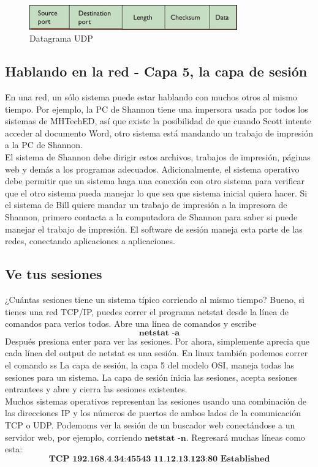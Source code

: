 \documentclass[12pt]{report}
\begin{document}
\begin{figure}[h]
\centering
\includegraphics[width=0.8\textwidth]{Datagrama.png}
\caption{Datagrama UDP}
\end{figure}

\subsection{Hablando en la red - Capa 5, la capa de sesión}
En una red, un sólo sistema puede estar hablando con muchos otros al mismo tiempo.
Por ejemplo, la PC de Shannon tiene una impersora usada por todos los sistemas
de MHTechED, así que existe la posibilidad de que cuando Scott intente 
acceder al documento Word, otro sistema está mandando un trabajo de impresión 
a la PC de Shannon.\\
El sistema de Shannon debe dirigir estos archivos, trabajos de impresión,
páginas web y demás a los programas adecuados. Adicionalmente,
el sistema operativo debe permitir que un sistema haga una conexión 
con otro sistema para verificar que el otro sistema pueda manejar lo que sea que 
sistema inicial quiera hacer. Si el sistema de Bill quiere mandar un 
trabajo de impresión a la impresora de Shannon, primero contacta
a la computadora de Shannon para saber si puede manejar el trabajo de impresión.
El software de sesión maneja esta parte de las redes, conectando 
aplicaciones a aplicaciones.\\

\subsection{Ve tus sesiones}
¿Cuántas sesiones tiene un sistema típico corriendo al mismo tiempo?
Bueno, si tienes una red TCP/IP, puedes correr el programa netstat 
desde la línea de comandos para verlos todos. Abre una línea de comandos y escribe
$$\textbf{netstat -a}$$
Después presiona enter para ver las sesiones. Por ahora, simplemente aprecia que cada línea
del output de netstat es una sesión. En linux también podemos correr el comando ss
La capa de sesión, la capa 5 del modelo OSI, maneja todas las sesiones para un sistema.
La capa de sesión inicia las sesiones, acepta sesiones entrantees y abre y cierra las sesiones
existentes.\\
Muchos sistemas operativos representan las sesiones usando una combinación
de las direcciones IP y los números de puertos de ambos lados de la comunicación 
TCP o UDP. Podemoms ver la sesión de un buscador web conectándose a un servidor web,
por ejemplo, corriendo $\textbf{netstat -n}$. Regresará muchas líneas como esta:
$$\textbf{TCP 192.168.4.34:45543     11.12.13.123:80    Established}$$
\end{document}
